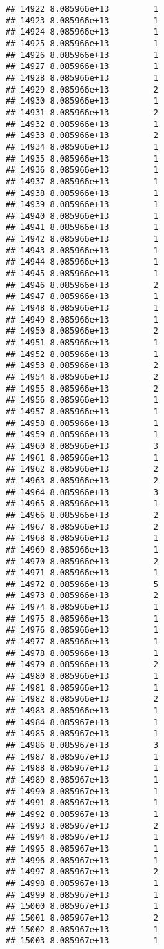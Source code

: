 \documentclass[
]{article}
\begin{document}
\begin{verbatim}
## 14922 8.085966e+13         1
## 14923 8.085966e+13         1
## 14924 8.085966e+13         1
## 14925 8.085966e+13         1
## 14926 8.085966e+13         1
## 14927 8.085966e+13         1
## 14928 8.085966e+13         1
## 14929 8.085966e+13         2
## 14930 8.085966e+13         1
## 14931 8.085966e+13         2
## 14932 8.085966e+13         1
## 14933 8.085966e+13         2
## 14934 8.085966e+13         1
## 14935 8.085966e+13         1
## 14936 8.085966e+13         1
## 14937 8.085966e+13         1
## 14938 8.085966e+13         1
## 14939 8.085966e+13         1
## 14940 8.085966e+13         1
## 14941 8.085966e+13         1
## 14942 8.085966e+13         1
## 14943 8.085966e+13         1
## 14944 8.085966e+13         1
## 14945 8.085966e+13         1
## 14946 8.085966e+13         2
## 14947 8.085966e+13         1
## 14948 8.085966e+13         1
## 14949 8.085966e+13         1
## 14950 8.085966e+13         2
## 14951 8.085966e+13         1
## 14952 8.085966e+13         1
## 14953 8.085966e+13         2
## 14954 8.085966e+13         2
## 14955 8.085966e+13         2
## 14956 8.085966e+13         1
## 14957 8.085966e+13         1
## 14958 8.085966e+13         1
## 14959 8.085966e+13         1
## 14960 8.085966e+13         3
## 14961 8.085966e+13         1
## 14962 8.085966e+13         2
## 14963 8.085966e+13         2
## 14964 8.085966e+13         3
## 14965 8.085966e+13         1
## 14966 8.085966e+13         2
## 14967 8.085966e+13         2
## 14968 8.085966e+13         1
## 14969 8.085966e+13         1
## 14970 8.085966e+13         2
## 14971 8.085966e+13         1
## 14972 8.085966e+13         5
## 14973 8.085966e+13         2
## 14974 8.085966e+13         1
## 14975 8.085966e+13         1
## 14976 8.085966e+13         1
## 14977 8.085966e+13         1
## 14978 8.085966e+13         1
## 14979 8.085966e+13         2
## 14980 8.085966e+13         1
## 14981 8.085966e+13         1
## 14982 8.085966e+13         2
## 14983 8.085966e+13         1
## 14984 8.085967e+13         1
## 14985 8.085967e+13         1
## 14986 8.085967e+13         3
## 14987 8.085967e+13         1
## 14988 8.085967e+13         1
## 14989 8.085967e+13         1
## 14990 8.085967e+13         1
## 14991 8.085967e+13         1
## 14992 8.085967e+13         1
## 14993 8.085967e+13         2
## 14994 8.085967e+13         1
## 14995 8.085967e+13         1
## 14996 8.085967e+13         1
## 14997 8.085967e+13         2
## 14998 8.085967e+13         1
## 14999 8.085967e+13         1
## 15000 8.085967e+13         1
## 15001 8.085967e+13         2
## 15002 8.085967e+13         1
## 15003 8.085967e+13         1

\end{verbatim}
\end{document}
